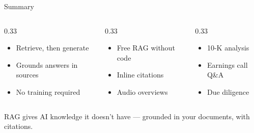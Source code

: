 \documentclass[aspectratio=169]{beamer}
\begin{document}
\begin{frame}{Summary}
\begin{columns}[T]
\begin{column}{0.33\textwidth}
\begin{shadedbox}[title=\textbf{RAG}]
\begin{itemize}\small
  \item Retrieve, then generate
  \item Grounds answers in sources
  \item No training required
\end{itemize}
\end{shadedbox}
\end{column}
\begin{column}{0.33\textwidth}
\begin{shadedbox}[title=\textbf{NotebookLM}]
\begin{itemize}\small
  \item Free RAG without code
  \item Inline citations
  \item Audio overviews
\end{itemize}
\end{shadedbox}
\end{column}
\begin{column}{0.33\textwidth}
\begin{shadedbox}[title=\textbf{Finance Uses}]
\begin{itemize}\small
  \item 10-K analysis
  \item Earnings call Q\&A
  \item Due diligence
\end{itemize}
\end{shadedbox}
\end{column}
\end{columns}
\vspace{0.5cm}
\begin{center}
\alert{RAG gives AI knowledge it doesn't have --- grounded in your documents, with citations.}
\end{center}
\end{frame}
\end{document}
